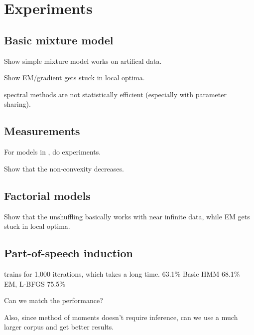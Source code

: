 \section{Experiments} \label{sec:experiments}

\subsection{Basic mixture model}

Show simple mixture model works on artifical data.

Show EM/gradient gets stuck in local optima.

spectral methods are not statistically efficient (especially with parameter sharing).

\subsection{Measurements}

For models in , do experiments.

Show that the non-convexity decreases.

\subsection{Factorial models}

Show that the unshuffling basically works with near infinite data, while EM gets stuck in local optima.

\subsection{Part-of-speech induction}

\cite{kirkpatrick10painless} trains for 1,000 iterations, which takes a long time.
63.1\% Basic HMM
68.1\% EM, L-BFGS 75.5\%

Can we match the performance?

Also, since method of moments doesn't require inference, can we use a much larger corpus
and get better results.
